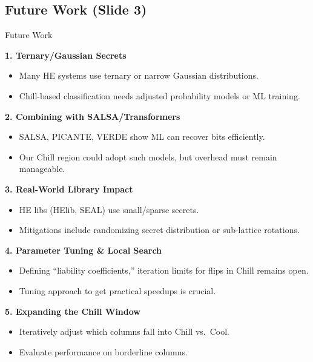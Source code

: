 \documentclass{beamer}
\begin{document}
\subsection*{Future Work (Slide 3)}
\begin{frame}{Future Work}

\textbf{1. Ternary/Gaussian Secrets}
\begin{itemize}
  \item Many HE systems use ternary or narrow Gaussian distributions.
  \item Chill-based classification needs adjusted probability models or ML training.
\end{itemize}

\textbf{2. Combining with SALSA/Transformers}
\begin{itemize}
  \item SALSA, PICANTE, VERDE show ML can recover bits efficiently.
  \item Our Chill region could adopt such models, but overhead must remain manageable.
\end{itemize}

\textbf{3. Real-World Library Impact}
\begin{itemize}
  \item HE libs (HElib, SEAL) use small/sparse secrets.
  \item Mitigations include randomizing secret distribution or sub-lattice rotations.
\end{itemize}

\textbf{4. Parameter Tuning \& Local Search}
\begin{itemize}
  \item Defining “liability coefficients,” iteration limits for flips in Chill remains open.
  \item Tuning approach to get practical speedups is crucial.
\end{itemize}

\textbf{5. Expanding the Chill Window}
\begin{itemize}
  \item Iteratively adjust which columns fall into Chill vs.\ Cool.
  \item Evaluate performance on borderline columns.
\end{itemize}
\end{frame}
\end{document}
